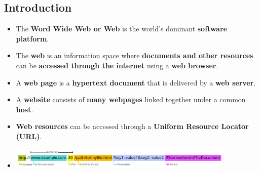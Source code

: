\documentclass[16pt]{article}
\begin{document}
    \subsection*{Introduction}
    \begin{itemize}
        \item The \textbf{Word Wide Web or Web} is the world's dominant \textbf{software platform}.
        \item The \textbf{web} is an information space where \textbf{documents and other resources} can be \textbf{accessed through the internet} using a \textbf{web browser}.
        \item A \textbf{web page} is a \textbf{hypertext document} that is delivered by a \textbf{web server}.
        \item A \textbf{website} consists of \textbf{many webpages} linked together under a common \textbf{host}.
        \item \textbf{Web resources} can be accessed through a \textbf{Uniform Resource Locator (URL)}.
        \item[] \includegraphics[width=407px]{images/URL.png}
    \end{itemize}
    
\end{document}
